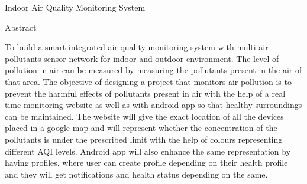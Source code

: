 \newpage\begin{center}
\huge{Indoor Air Quality Monitoring System} %
\end{center}
\begin{center}
\Large{Abstract}\\
\end{center}

\normalsize

To build a smart integrated air quality monitoring system with multi-air pollutants sensor network for indoor and outdoor environment. The level of pollution in air can be measured by measuring the pollutants present in the air of that area. The objective of designing a project that monitors air pollution is to prevent the harmful eﬀects of pollutants present in air with the help of a real time monitoring website as well as with android app so that healthy surroundings can be maintained. The website will give the exact location of all the devices placed in a google map and will represent whether the concentration of the pollutants is under the prescribed limit with the help of colours representing diﬀerent AQI levels. Android app will also enhance the same representation by having proﬁles, where user can create proﬁle depending on their health proﬁle and they will get notiﬁcations and health status depending on the same. 
 
 